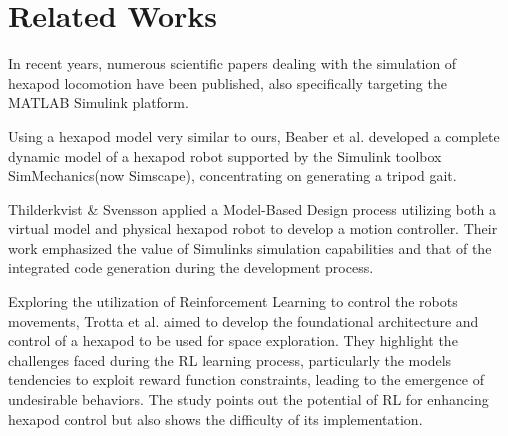 \chapter{Related Works}
\label{ch:relatedWorks}

In recent years, numerous scientific papers dealing with the simulation of hexapod locomotion have been published, also specifically targeting the MATLAB Simulink platform.

Using a hexapod model very similar to ours, Beaber et al. \parencite{beaber2018dynamic} developed a complete dynamic model of a hexapod robot supported by the Simulink toolbox SimMechanics(now Simscape), concentrating on generating a tripod gait.

Thilderkvist \& Svensson \Parencite{thilderkvist2015motion} applied a Model-Based Design process utilizing both a virtual model and physical hexapod robot to develop a motion controller.
Their work emphasized the value of Simulinks simulation capabilities and that of the integrated code generation during the development process.

Exploring the utilization of Reinforcement Learning to control the robots movements, Trotta et al. \parencite{trotta2022walking} aimed to develop the foundational architecture and control of a hexapod to be used for space exploration.
They highlight the challenges faced during the RL learning process, particularly the models tendencies to exploit reward function constraints, leading to the emergence of undesirable behaviors.
The study points out the potential of RL for enhancing hexapod control but also shows the difficulty of its implementation.


